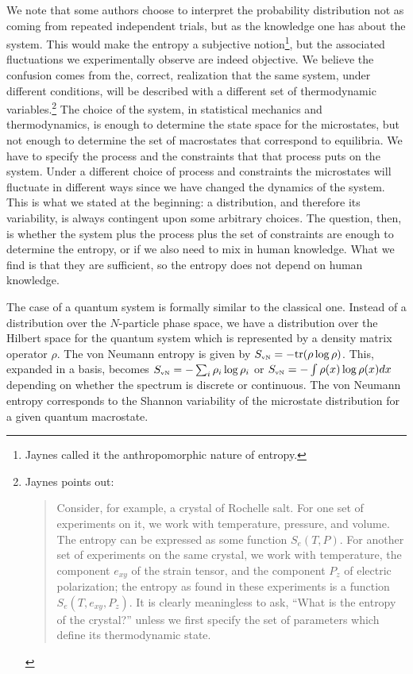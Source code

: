 \documentclass[iopart]{revtex4-1}
\begin{document}
We note that some authors choose to interpret the probability distribution not as coming from repeated independent trials, but as the knowledge one has about the system. This would make the entropy a subjective notion\footnote{Jaynes\cite{Jaynes} called it the anthropomorphic nature of entropy.}, but the associated fluctuations we experimentally observe are indeed objective. We believe the confusion comes from the, correct, realization that the same system, under different conditions, will be described with a different set of thermodynamic variables.\footnote{Jaynes\cite{Jaynes} points out:
\begin{quote}
Consider, for example, a crystal of Rochelle salt. For one set of experiments on it, we work with temperature, pressure, and volume. The entropy can be expressed as some function $S_e(T,P)$. For another set of experiments on the same crystal, we work with temperature, the component $e_{xy}$ of the strain tensor, and the component $P_z$ of electric polarization; the entropy as found in these experiments is a function $S_e(T,e_{xy},P_z)$. It is clearly  meaningless to ask, ``What is the entropy of the crystal?''  unless we first specify the set of parameters which define its thermodynamic state.
\end{quote}}
The choice of the system, in statistical mechanics and thermodynamics, is enough to determine the state space for the microstates, but not enough to determine the set of macrostates that correspond to equilibria. We have to specify the process and the constraints that that process puts on the system. Under a different choice of process and constraints the microstates will fluctuate in different ways since we have changed the dynamics of the system. This is what we stated at the beginning: a distribution, and therefore its variability, is always contingent upon some arbitrary choices. The question, then, is whether the system plus the process plus the set of constraints are enough to determine the entropy, or if we also need to mix in human knowledge. What we find is that they are sufficient, so the entropy does not depend on human knowledge.

The case of a quantum system is formally similar to the classical one. Instead of a distribution over the $N$-particle phase space, we have a distribution over the Hilbert space for the quantum system which is represented by a density matrix operator $\rho$. The von Neumann entropy is given by $S_\textrm{\tiny{vN}} = - \textrm{tr}(\rho \log \rho)$. This, expanded in a basis, becomes $S_\textrm{\tiny{vN}} = - \sum_i \rho_i \log \rho_i$ or $S_\textrm{\tiny{vN}} = - \int \rho(x) \log \rho(x)dx$ depending on whether the spectrum is discrete or continuous.  The von Neumann entropy corresponds to the Shannon variability of the microstate distribution for a given quantum macrostate.
\end{document}
